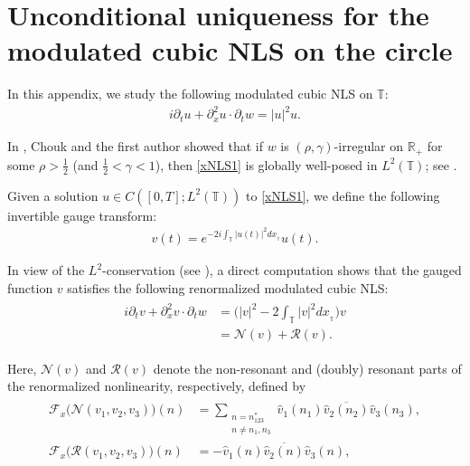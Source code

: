 \documentclass[letterpaper, 11pt,  reqno]{amsart}
\newcommand{\1}{\hspace{0.5mm}\text{I}\hspace{0.5mm}}
\newcommand{\noi}{\noindent}
\newcommand{\R}{\mathbb{R}}
\newcommand{\T}{\mathbb{T}}
\newcommand{\RR}{\mathcal{R}}
\newcommand{\F}{\mathcal{F}}
\newcommand{\g}{\gamma}
\newcommand{\ft}{\widehat}
\newcommand{\cj}{\overline}
\newcommand{\dx}{\partial_x}
\newcommand{\dt}{\partial_t}
\newcommand{\NN}{\mathcal{N}}
\numberwithin{equation}{section}
\numberwithin{theorem}{section}
\begin{document}
\appendix

\section{Unconditional uniqueness for the  modulated cubic NLS 
on the circle}
\label{SEC:A}

In this appendix, we study  the 
 following modulated cubic NLS on $\T$:
\begin{align}
i \dt u + \dx^2 u \cdot \dt w= |u|^2u.
\label{xNLS1}
\end{align}


\noi
In \cite{CG1},
Chouk and the first author showed that 
if   $w$ is $(\rho,\g)$-irregular on $\R_+$
for some $\rho > \frac 12 $ (and $\frac 12 < \g < 1$), 
then \eqref{xNLS1} is  globally well-posed
in $L^2(\T)$; see \cite[Theorem~1.8]{CG1}.


Given a solution $u \in C([0, T]; L^2(\T))$ to \eqref{xNLS1}, we
define the following invertible gauge transform:
\begin{align}
v(t) = e^{-2i \int_\T |u(t)|^2 dx_{_\T}}u(t).
\label{gauge1}
\end{align}

\noi
In view of the $L^2$-conservation (see \cite[Subsection 3.3]{CG1}), 
a direct computation shows that the gauged function $v$ satisfies 
the following renormalized modulated cubic NLS:
\begin{align}
\begin{split}
i \dt v + \dx^2 v \cdot \dt w
& = \Big(|v|^2 - 2 \int_\T|v|^2 dx_{_\T} \Big)v \\
& = \NN(v) + \RR(v).
\end{split}
\label{xNLS2}
\end{align}


\noi
Here,  $\NN(v)$ and $\RR(v)$ denote the non-resonant 
 and  (doubly)  resonant parts of the renormalized nonlinearity,
respectively, 
defined by 
\begin{align}
\begin{split}
\F_x\big(\NN(v_1,v_2,v_3)\big)(n) 
& = \sum_{\substack{n = n_{123}^*\\ n\neq n_{1},n_{3}}}
\ft v_1 (n_1) \cj{\ft v_2 (n_2)} \ft v_3 (n_3), \\
\F_x\big(\RR(v_1,v_2,v_3)\big) (n) 
& = - 
\ft v_1 (n) \cj{\ft v_2 (n)} \ft v_3 (n), 
\end{split}
\label{non1}
\end{align}
\end{document}
